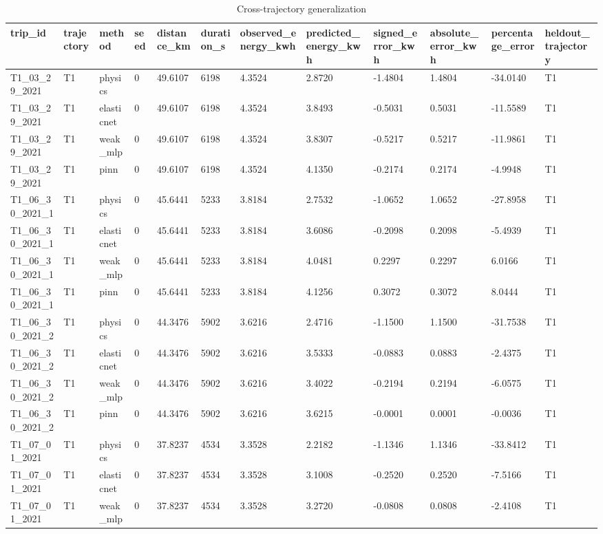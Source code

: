 \begin{table}[t]
\centering
\caption{Cross-trajectory generalization}
\label{tab:xtraj}
\begin{tabular}{llllllllllll}
\hline
trip\_id & trajectory & method & seed & distance\_km & duration\_s & observed\_energy\_kwh & predicted\_energy\_kwh & signed\_error\_kwh & absolute\_error\_kwh & percentage\_error & heldout\_trajectory \\
\hline
T1\_03\_29\_2021 & T1 & physics & 0 & 49.6107 & 6198 & 4.3524 & 2.8720 & -1.4804 & 1.4804 & -34.0140 & T1 \\
T1\_03\_29\_2021 & T1 & elasticnet & 0 & 49.6107 & 6198 & 4.3524 & 3.8493 & -0.5031 & 0.5031 & -11.5589 & T1 \\
T1\_03\_29\_2021 & T1 & weak\_mlp & 0 & 49.6107 & 6198 & 4.3524 & 3.8307 & -0.5217 & 0.5217 & -11.9861 & T1 \\
T1\_03\_29\_2021 & T1 & pinn & 0 & 49.6107 & 6198 & 4.3524 & 4.1350 & -0.2174 & 0.2174 & -4.9948 & T1 \\
T1\_06\_30\_2021\_1 & T1 & physics & 0 & 45.6441 & 5233 & 3.8184 & 2.7532 & -1.0652 & 1.0652 & -27.8958 & T1 \\
T1\_06\_30\_2021\_1 & T1 & elasticnet & 0 & 45.6441 & 5233 & 3.8184 & 3.6086 & -0.2098 & 0.2098 & -5.4939 & T1 \\
T1\_06\_30\_2021\_1 & T1 & weak\_mlp & 0 & 45.6441 & 5233 & 3.8184 & 4.0481 & 0.2297 & 0.2297 & 6.0166 & T1 \\
T1\_06\_30\_2021\_1 & T1 & pinn & 0 & 45.6441 & 5233 & 3.8184 & 4.1256 & 0.3072 & 0.3072 & 8.0444 & T1 \\
T1\_06\_30\_2021\_2 & T1 & physics & 0 & 44.3476 & 5902 & 3.6216 & 2.4716 & -1.1500 & 1.1500 & -31.7538 & T1 \\
T1\_06\_30\_2021\_2 & T1 & elasticnet & 0 & 44.3476 & 5902 & 3.6216 & 3.5333 & -0.0883 & 0.0883 & -2.4375 & T1 \\
T1\_06\_30\_2021\_2 & T1 & weak\_mlp & 0 & 44.3476 & 5902 & 3.6216 & 3.4022 & -0.2194 & 0.2194 & -6.0575 & T1 \\
T1\_06\_30\_2021\_2 & T1 & pinn & 0 & 44.3476 & 5902 & 3.6216 & 3.6215 & -0.0001 & 0.0001 & -0.0036 & T1 \\
T1\_07\_01\_2021 & T1 & physics & 0 & 37.8237 & 4534 & 3.3528 & 2.2182 & -1.1346 & 1.1346 & -33.8412 & T1 \\
T1\_07\_01\_2021 & T1 & elasticnet & 0 & 37.8237 & 4534 & 3.3528 & 3.1008 & -0.2520 & 0.2520 & -7.5166 & T1 \\
T1\_07\_01\_2021 & T1 & weak\_mlp & 0 & 37.8237 & 4534 & 3.3528 & 3.2720 & -0.0808 & 0.0808 & -2.4108 & T1 \\

\end{tabular}
\end{table}
